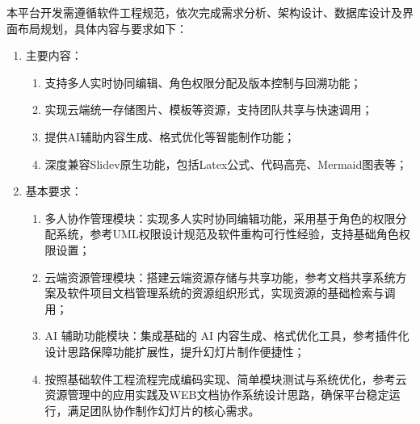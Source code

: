 本平台开发需遵循软件工程规范，依次完成需求分析、架构设计、数据库设计及界面布局规划，具体内容与要求如下：
\begin{enumerate}
    \item 主要内容：
    \begin{enumerate}
        \item 支持多人实时协同编辑、角色权限分配及版本控制与回溯功能；
        \item 实现云端统一存储图片、模板等资源，支持团队共享与快速调用；
        \item 提供AI辅助内容生成、格式优化等智能制作功能；
        \item 深度兼容Slidev原生功能，包括Latex公式、代码高亮、Mermaid图表等；
    \end{enumerate}
    \item 基本要求：
    \begin{enumerate}
        \item 多人协作管理模块：实现多人实时协同编辑功能，采用基于角色的权限分配系统\cite{zhang2013rbac,wu2002rbacweb,kuhlmann2013uml}，参考UML权限设计规范\cite{kuhlmann2013uml}及软件重构可行性经验\cite{li2011reengineering}，支持基础角色权限设置；
        \item 云端资源管理模块：搭建云端资源存储与共享功能，参考文档共享系统方案\cite{li2015filenet}及软件项目文档管理系统的资源组织形式\cite{zhang2024javaweb}，实现资源的基础检索与调用；
        \item AI 辅助功能模块：集成基础的 AI 内容生成、格式优化工具，参考插件化设计思路\cite{cai2022microfrontend}保障功能扩展性，提升幻灯片制作便捷性；
        \item 按照基础软件工程流程完成编码实现、简单模块测试与系统优化，参考云资源管理中的应用实践\cite{wei2025rbaccloud}及WEB文档协作系统设计思路\cite{tan2012web,li2020cscw}，确保平台稳定运行，满足团队协作制作幻灯片的核心需求。
    \end{enumerate}
\end{enumerate}

